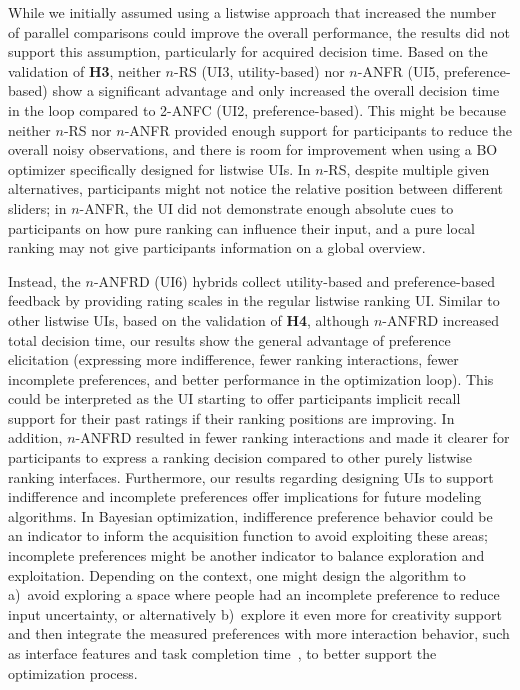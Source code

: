 \documentclass[acmsmall,screen,nonacm]{acmart}
\begin{document}
While we initially assumed using a listwise approach that increased the number of parallel comparisons could improve the overall performance, the results did not support this assumption, particularly for acquired decision time. Based on the validation of \textbf{H3}, neither $n$-RS (UI3, utility-based) nor $n$-ANFR (UI5, preference-based) show a significant advantage and only increased the overall decision time in the loop compared to 2-ANFC (UI2, preference-based).
%
This might be because neither $n$-RS nor $n$-ANFR provided enough support for participants to reduce the overall noisy observations, and there is room for improvement when using a BO optimizer specifically designed for listwise UIs. In $n$-RS, despite multiple given alternatives, participants might not notice the relative position between different sliders; in $n$-ANFR, the UI did not demonstrate enough absolute cues to participants on how pure ranking can influence their input, and a pure local ranking may not give participants information on a global overview.

Instead, the $n$-ANFRD (UI6) hybrids collect utility-based and preference-based feedback by providing rating scales in the regular listwise ranking UI. Similar to other listwise UIs, based on the validation of \textbf{H4}, although $n$-ANFRD increased total decision time, our results show the general advantage of preference elicitation (expressing more indifference, fewer ranking interactions, fewer incomplete preferences, and better performance in the optimization loop).
%
This could be interpreted as the UI starting to offer participants implicit recall support for their past ratings if their ranking positions are improving. In addition, $n$-ANFRD resulted in fewer ranking interactions and made it clearer for participants to express a ranking decision compared to other purely listwise ranking interfaces.
%
Furthermore, our results regarding designing UIs to support indifference and incomplete preferences offer implications for future modeling algorithms. In Bayesian optimization, indifference preference behavior could be an indicator to inform the acquisition function to avoid exploiting these areas; incomplete preferences might be another indicator to balance exploration and exploitation.
%
Depending on the context, one might design the algorithm to a)~avoid exploring a space where people had an incomplete preference to reduce input uncertainty, or alternatively b)~explore it even more for creativity support and then integrate the measured preferences with more interaction behavior, such as interface features and task completion time~\cite{dudley2019crowdsourcing}, to better support the optimization process.
\end{document}
